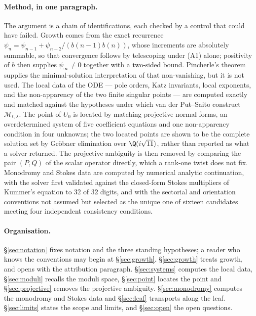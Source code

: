 \paragraph{Method, in one paragraph.} The argument is a chain of
identifications, each checked by a control that could have failed. Growth comes
from the exact recurrence
$\psi_n=\psi_{n-1}+\psi_{n-2}/(b(n-1)b(n))$, whose increments are absolutely
summable, so that convergence follows by telescoping under (A1) alone;
positivity of $b$ then supplies $\psi_\infty\neq0$ together with a two-sided
bound. Pincherle's theorem supplies the minimal-solution interpretation of that
non-vanishing, but it is not used. The local data of the ODE --- pole orders,
Katz invariants, local exponents, and the non-apparency of the two finite
singular points --- are computed exactly and matched against the hypotheses
under which van der Put--Saito construct $\mathcal M_{t,\lambda}$. The point of $U_0$ is
located by matching projective normal forms, an overdetermined system of five
coefficient equations and one non-apparency condition in four unknowns; the two
located points are shown to be the complete solution set by Gr\"obner
elimination over $\Q(i\sqrt{11})$, rather than reported as what a solver
returned. The projective ambiguity is then removed by comparing the pair
$(P,Q)$ of the scalar operator directly, which a rank-one twist does not fix.
Monodromy and Stokes data are computed by numerical analytic continuation, with
the solver first validated against the closed-form Stokes multipliers of
Kummer's equation to 32 of 32 digits, and with the sectorial and orientation
conventions not assumed but selected as the unique one of sixteen candidates
meeting four independent consistency conditions.

\paragraph{Organisation.} \S\ref{sec:notation} fixes notation and the three
standing hypotheses; a reader who knows the conventions may begin at
\S\ref{sec:growth}. \S\ref{sec:growth} treats growth, and opens with the
attribution paragraph. \S\ref{sec:systems} computes the local data,
\S\ref{sec:moduli} recalls the moduli space, \S\ref{sec:point} locates the
point and \S\ref{sec:projective} removes the projective ambiguity.
\S\ref{sec:monodromy} computes the monodromy and Stokes data and
\S\ref{sec:leaf} transports along the leaf. \S\ref{sec:limits} states the scope
and limits, and \S\ref{sec:open} the open questions.
